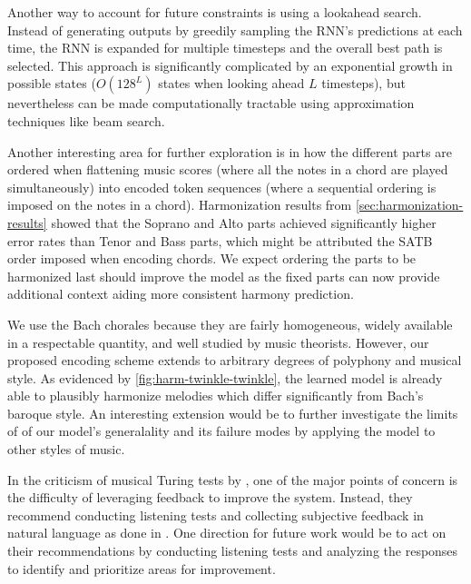 Another way to account for future constraints is using a lookahead
search. Instead of generating outputs by greedily sampling the RNN's
predictions at each time, the RNN is expanded for multiple timesteps and
the overall best path is selected. This approach is significantly
complicated by an exponential growth in possible states ($O(128^L)$
states when looking ahead $L$ timesteps), but nevertheless can be made
computationally tractable using approximation techniques like
beam search\citep{norvig1992paradigms}.

Another interesting area for further exploration is in how the different parts
are ordered when flattening music scores (where all the notes in a chord are
played simultaneously) into encoded token sequences (where a sequential
ordering is imposed on the notes in a chord). Harmonization results from
\vref{sec:harmonization-results} showed that the Soprano and Alto parts
achieved significantly higher error rates than Tenor and Bass parts, which
might be attributed the SATB order imposed when encoding chords. We expect
ordering the parts to be harmonized last should improve the model as the fixed
parts can now provide additional context aiding more consistent harmony
prediction.

We use the Bach chorales because they are fairly homogeneous, widely available
in a respectable quantity, and well studied by music theorists. However, our
proposed encoding scheme extends to arbitrary degrees of polyphony and musical
style. As evidenced by \vref{fig:harm-twinkle-twinkle}, the learned model is
already able to plausibly harmonize melodies which differ significantly from
Bach's baroque style. An interesting extension would be to further investigate
the limits of of our model's generalality and its failure modes by applying
the model to other styles of music.

In the criticism of musical Turing tests by \citet{ariza2009interrogator}, one
of the major points of concern is the difficulty of leveraging feedback to
improve the system. Instead, they recommend conducting listening tests and
collecting subjective feedback in natural language as done in
\citet{collins2016developing}. One direction for future work would be to
act on their recommendations by conducting listening tests and analyzing
the responses to identify and prioritize areas for improvement.

